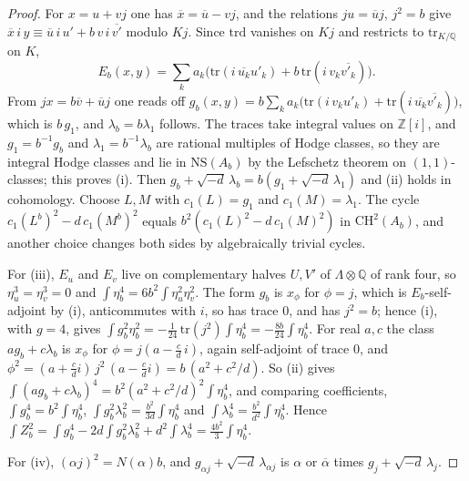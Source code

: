 \documentclass[11pt,reqno]{amsart}
\theoremstyle{plain}
\theoremstyle{definition}
\theoremstyle{remark}
\newcommand{\QQ}{\mathbb{Q}}
\newcommand{\ZZ}{\mathbb{Z}}
\newcommand{\bbar}[1]{\overline{#1}}
\begin{document}
\begin{proof}
For $x=u+vj$ one has $\bbar{x}=\bbar{u}-vj$, and the relations $ju=\bbar{u}j$,
$j^{2}=b$ give
$\bbar{x}\,i\,y\equiv\bbar{u}\,i\,u'+b\,v\,i\,\bbar{v'}$ modulo $Kj$. Since
$\mathrm{trd}$ vanishes on $Kj$ and restricts to $\mathrm{tr}_{K/\QQ}$ on $K$,
\[
  E_{b}(x,y)=\textstyle\sum_{k}a_{k}\bigl(\mathrm{tr}(i\,\bbar{u_{k}}u'_{k})
  +b\,\mathrm{tr}(i\,v_{k}\bbar{v'_{k}})\bigr).
\]
From $jx=b\bbar{v}+\bbar{u}j$ one reads off
$g_{b}(x,y)=b\sum_{k}a_{k}\bigl(\mathrm{tr}(i\,v_{k}u'_{k})
+\mathrm{tr}(i\,\bbar{u_{k}}\bbar{v'_{k}})\bigr)$, which is $b\,g_{1}$, and
$\lambda_{b}=b\lambda_{1}$ follows. The traces take integral values on
$\ZZ[i]$, and $g_{1}=b^{-1}g_{b}$ and $\lambda_{1}=b^{-1}\lambda_{b}$ are
rational multiples of Hodge classes, so they are integral Hodge classes and
lie in $\mathrm{NS}(A_{b})$ by the Lefschetz theorem on $(1,1)$-classes; this
proves (i). Then
$g_{b}+\sqrt{-d}\,\lambda_{b}=b(g_{1}+\sqrt{-d}\,\lambda_{1})$ and (ii) holds
in cohomology. Choose $L,M$ with $c_{1}(L)=g_{1}$ and
$c_{1}(M)=\lambda_{1}$. The cycle $c_{1}(L^{b})^{2}-d\,c_{1}(M^{b})^{2}$ equals
$b^{2}(c_{1}(L)^{2}-d\,c_{1}(M)^{2})$ in $\mathrm{CH}^{2}(A_{b})$, and another
choice changes both sides by algebraically trivial cycles.

For (iii), $E_{u}$ and $E_{v}$ live on complementary halves $U,V'$ of
$\Lambda\otimes\QQ$ of rank four, so $\eta_{u}^{3}=\eta_{v}^{3}=0$ and
$\int\eta_{b}^{4}=6b^{2}\int\eta_{u}^{2}\eta_{v}^{2}$. The form $g_{b}$ is
$x_{\phi}$ for $\phi=j$, which is $E_{b}$-self-adjoint by
(i), anticommutes with $i$, so has trace $0$, and has
$j^{2}=b$; hence (i), with $g=4$, gives
$\int g_{b}^{2}\eta_{b}^{2}=-\tfrac{1}{24}\,\mathrm{tr}(j^{2})\int\eta_{b}^{4}
=-\tfrac{8b}{24}\int\eta_{b}^{4}$. For real $a,c$ the class
$ag_{b}+c\lambda_{b}$ is $x_{\phi}$ for $\phi=j(a-\tfrac{c}{d}\,i)$, again
self-adjoint of trace $0$, and
$\phi^{2}=(a+\tfrac{c}{d}i)\,j^{2}\,(a-\tfrac{c}{d}i)=b\,(a^{2}+c^{2}/d)$.
So (ii) gives
$\int(ag_{b}+c\lambda_{b})^{4}=b^{2}(a^{2}+c^{2}/d)^{2}\int\eta_{b}^{4}$, and
comparing coefficients, $\int g_{b}^{4}=b^{2}\int\eta_{b}^{4}$,
$\int g_{b}^{2}\lambda_{b}^{2}=\tfrac{b^{2}}{3d}\int\eta_{b}^{4}$ and
$\int\lambda_{b}^{4}=\tfrac{b^{2}}{d^{2}}\int\eta_{b}^{4}$. Hence
$\int Z_{b}^{2}=\int g_{b}^{4}-2d\int g_{b}^{2}\lambda_{b}^{2}
+d^{2}\int\lambda_{b}^{4}=\tfrac{4b^{2}}{3}\int\eta_{b}^{4}$.

For (iv), $(\alpha j)^{2}=N(\alpha)b$, and
$g_{\alpha j}+\sqrt{-d}\,\lambda_{\alpha j}$ is $\alpha$ or $\bbar{\alpha}$
times $g_{j}+\sqrt{-d}\,\lambda_{j}$.
\end{proof}
\end{document}
